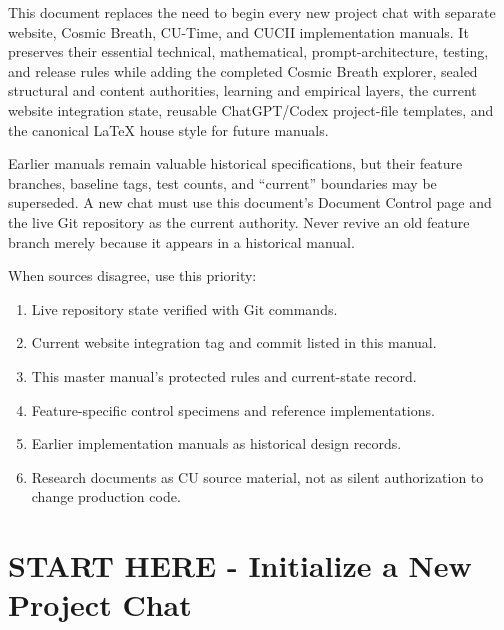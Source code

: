 \documentclass[11pt,letterpaper]{article}
\begin{document}
\begin{purposebox}
This document replaces the need to begin every new project chat with separate
website, Cosmic Breath, CU-Time, and CUCII implementation manuals. It preserves
their essential technical, mathematical, prompt-architecture, testing, and
release rules while adding the completed Cosmic Breath explorer, sealed
structural and content authorities, learning and empirical layers, the current
website integration state, reusable ChatGPT/Codex project-file templates, and
the canonical LaTeX house style for future manuals.
\end{purposebox}

\begin{safetybox}
Earlier manuals remain valuable historical specifications, but their feature
branches, baseline tags, test counts, and ``current'' boundaries may be
superseded. A new chat must use this document's Document Control page and the
live Git repository as the current authority. Never revive an old feature
branch merely because it appears in a historical manual.
\end{safetybox}

\begin{authoritybox}
When sources disagree, use this priority:
\begin{enumerate}
    \item Live repository state verified with Git commands.
    \item Current website integration tag and commit listed in this manual.
    \item This master manual's protected rules and current-state record.
    \item Feature-specific control specimens and reference implementations.
    \item Earlier implementation manuals as historical design records.
    \item Research documents as CU source material, not as silent authorization
          to change production code.
\end{enumerate}
\end{authoritybox}

\clearpage
\tableofcontents
\clearpage

\section*{START HERE - Initialize a New Project Chat}
\end{document}
